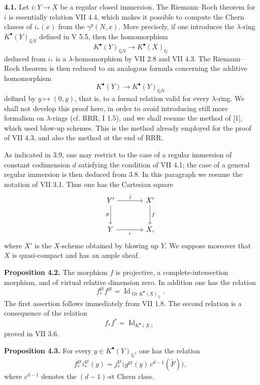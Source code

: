 \documentclass[11pt]{article}
\newcommand{\Gr}{\operatorname{Gr}}
\newcommand{\RRR}{\mathrm{RRR}}
\providecommand{\Gr}{\operatorname{Gr}}
\providecommand{\Gr}{\operatorname{G}}
\begin{document}
\textbf{4.1.} Let \(i:Y\to X\) be a regular closed immersion. The Riemann--Roch theorem for \(i\) is essentially relation VII 4.4, which makes it possible to compute the Chern classes of \(i_*(x)\) from the \(\gamma^p(N,x)\). More precisely, if one introduces the \(\lambda\)-ring \(K^{\bullet}(Y)_{\mathbb Q N}\) defined in V 5.5, then the homomorphism
\[
K^{\bullet}(Y)_{\mathbb Q N}\longrightarrow K^{\bullet}(X)_{\mathbb Q}
\]
deduced from \(i_*\) is a \(\lambda\)-homomorphism by VII 2.8 and VII 4.3. The Riemann--Roch theorem is then reduced to an analogous formula concerning the additive homomorphism
\[
K^{\bullet}(Y)\longrightarrow K^{\bullet}(Y)_{\mathbb Q N}
\]
defined by \(y\mapsto(0,y)\), that is, to a formal relation valid for every \(\lambda\)-ring. We shall not develop this proof here, in order to avoid introducing still more formalism on \(\lambda\)-rings (cf. \(\RRR\), I 1.5), and we shall resume the method of [1], which used blow-up schemes. This is the method already employed for the proof of VII 4.3, and also the method at the end of \(\RRR\).

As indicated in 3.9, one may restrict to the case of a regular immersion of constant codimension \(d\) satisfying the condition of VII 4.1; the case of a general regular immersion is then deduced from 3.8. In this paragraph we resume the notation of VII 3.1. Thus one has the Cartesian square
\[
\begin{tikzcd}[column sep=large,row sep=large]
Y' \arrow[r,"j"] \arrow[d,"g"'] & X' \arrow[d,"f"]\\
Y \arrow[r,"i"'] & X ,
\end{tikzcd}
\]
where \(X'\) is the \(X\)-scheme obtained by blowing up \(Y\). We suppose moreover that \(X\) is quasi-compact and has an ample sheaf.

\textbf{Proposition 4.2.} The morphism \(f\) is projective, a complete-intersection morphism, and of virtual relative dimension zero. In addition one has the relation
\[
 f^{\mathrm{gr}}_* f^{\mathrm{gr}}=\operatorname{Id}_{\Gr K^{\bullet}(X)_{\mathbb Q}} .
\]
The first assertion follows immediately from VII 1.8. The second relation is a consequence of the relation
\[
 f_*f^*=\operatorname{Id}_{K^{\bullet}(X)}
\]
proved in VII 3.6.

\textbf{Proposition 4.3.} For every \(y\in K^{\bullet}(Y)_{\mathbb Q}\), one has the relation
\[
 f^{\mathrm{gr}}_* i^{\mathrm{gr}}_*(y)
 =
 j^{\mathrm{gr}}_*\bigl(g^{\mathrm{gr}}(y)\,c^{d-1}(\check F)\bigr),
\]
where \(c^{d-1}\) denotes the \((d-1)\)-st Chern class.
\end{document}
